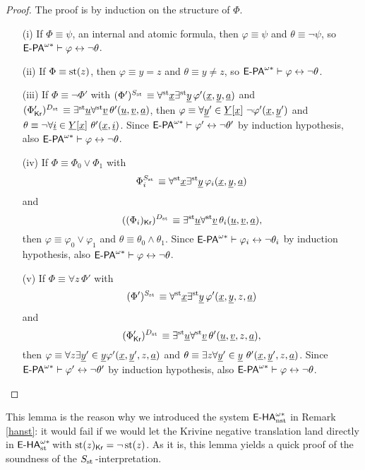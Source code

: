 \begin{proof} The proof is by induction on the structure of $\Phi$.
\begin{enumerate}
\item[(i)] If $\Phi \equiv \psi$, an internal and atomic formula, then $\varphi \equiv \psi$ and $\theta \equiv \lnot \psi$, so ${\textsf{\upshape E-PA}}^{\omega*} \vdash \varphi \leftrightarrow \lnot \theta$.
\item[(ii)] If $\Phi \equiv \operatorname{st}(z)$, then $\varphi \equiv y = z$ and $\theta \equiv y \not= z$, so ${\textsf{\upshape E-PA}}^{\omega*} \vdash \varphi \leftrightarrow \lnot \theta$.
\item[(iii)] If $\Phi \equiv \lnot \Phi'$ with $(\Phi')^{\protect{S_{\operatorname{st}{}}}} \equiv \forall^{\operatorname{st}{}}\! \underline x\exists^{\operatorname{st}{}}\!  \underline y \, \varphi'(\underline x, \underline y, \underline a)$ and $(\Phi'_{\textsf{\upshape Kr}})^{\protect{D_{\operatorname{st}{}}}} \equiv \exists^{\operatorname{st}{}}\! \underline u \forall^{\operatorname{st}{}}\! \underline v \, \theta'(\underline u,\underline v, \underline a)$, then $\varphi \equiv \forall \tup y' \in \tup Y[\tup x]\ \neg\phi'(\tup x,\tup y')$ and $\theta \equiv \neg\forall \underline i\in \underline Y[\underline x]\ \theta'(\underline x,\underline i)$. Since ${\textsf{\upshape E-PA}}^{\omega*} \vdash \varphi' \leftrightarrow \lnot \theta'$ by induction hypothesis, also ${\textsf{\upshape E-PA}}^{\omega*} \vdash \varphi \leftrightarrow \lnot \theta$.
\item[(iv)] If $\Phi \equiv \Phi_0 \lor \Phi_1$ with \[ \Phi_i^{\protect{S_{\operatorname{st}{}}}} \equiv \forall^{\operatorname{st}{}}\! \underline x\exists^{\operatorname{st}{}}\!  \underline y \, \varphi_i(\underline x, \underline y, \underline a) \] and \[ ((\Phi_i)_{\textsf{\upshape Kr}})^{\protect{D_{\operatorname{st}{}}}} \equiv \exists^{\operatorname{st}{}}\! \underline u \forall^{\operatorname{st}{}}\! \underline v \, \theta_i(\underline u,\underline v, \underline a),\] then $\varphi \equiv \varphi_0 \lor \varphi_1$ and $\theta \equiv \theta_0 \land \theta_1$. Since ${\textsf{\upshape E-PA}}^{\omega*} \vdash \varphi_i \leftrightarrow \lnot \theta_i$ by induction hypothesis, also ${\textsf{\upshape E-PA}}^{\omega*} \vdash \varphi \leftrightarrow \lnot \theta$.
\item[(v)] If $\Phi \equiv \forall z \, \Phi'$ with \[ (\Phi')^{\protect{S_{\operatorname{st}{}}}} \equiv \forall^{\operatorname{st}{}}\! \underline x\exists^{\operatorname{st}{}}\!  \underline y \, \varphi'(\underline x, \underline y, z, \underline a) \] and \[ (\Phi'_{\textsf{\upshape Kr}})^{\protect{D_{\operatorname{st}{}}}} \equiv \exists^{\operatorname{st}{}}\! \underline u \forall^{\operatorname{st}{}}\! \underline v \, \theta'(\underline u,\underline v, z, \underline a),\] then $\varphi \equiv \forall z \exists \underline y' \in \underline y \varphi'(\underline x, \underline y', z, \underline a)$ and $\theta \equiv \exists z\forall  \tup y' \in \tup y\ \theta'(\tup x,\tup y',z, \tup a)$. Since ${\textsf{\upshape E-PA}}^{\omega*} \vdash \varphi' \leftrightarrow \lnot \theta'$ by induction hypothesis, also ${\textsf{\upshape E-PA}}^{\omega*} \vdash \varphi \leftrightarrow \lnot \theta$.
\end{enumerate}
\end{proof}

\begin{remark}
This lemma is the reason why we introduced the system ${\textsf{\upshape E-HA}}^{\omega*}_{\operatorname{nst}{}}\!$ in Remark \ref{hanst}: it would fail if we would let the Krivine negative translation land directly in ${\textsf{\upshape E-HA}}^{\omega*}_{\operatorname{st}{}}\!$ with $\operatorname{st}(z)_{\textsf{\upshape Kr}} = \lnot \operatorname{st}(z)$. As it is, this lemma yields a quick proof of the soundness of the $\protect{S_{\operatorname{st}{}}}$-interpretation.
\end{remark}

